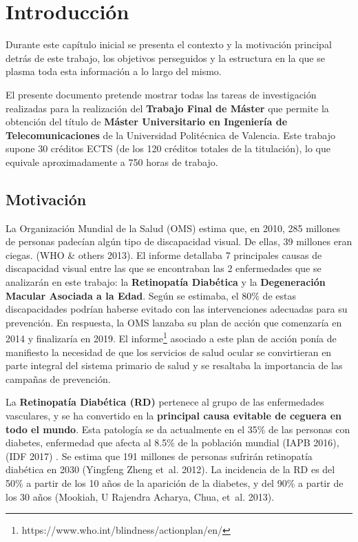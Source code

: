 \documentclass[
  12pt,
  spanish,
  a4paperpaper,
]{report}
\begin{document}
\newpage
\setcounter{page}{1}
\renewcommand{\thepage}{\arabic{page}}

\hypertarget{intro}{%
\chapter{Introducción}\label{intro}}

Durante este capítulo inicial se presenta el contexto y la motivación
principal detrás de este trabajo, los objetivos perseguidos y la
estructura en la que se plasma toda esta información a lo largo del
mismo.

El presente documento pretende mostrar todas las tareas de investigación
realizadas para la realización del \textbf{Trabajo Final de Máster} que
permite la obtención del título de \textbf{Máster Universitario en
Ingeniería de Telecomunicaciones} de la Universidad Politécnica de
Valencia. Este trabajo supone 30 créditos ECTS (de los 120 créditos
totales de la titulación), lo que equivale aproximadamente a 750 horas
de trabajo.

\hypertarget{motivaciuxf3n}{%
\section{Motivación}\label{motivaciuxf3n}}

La Organización Mundial de la Salud (OMS) estima que, en 2010, 285
millones de personas padecían algún tipo de discapacidad visual. De
ellas, 39 millones eran ciegas. (WHO \& others 2013). El informe
detallaba 7 principales causas de discapacidad visual entre las que se
encontraban las 2 enfermedades que se analizarán en este trabajo: la
\textbf{Retinopatía Diabética} y la \textbf{Degeneración Macular
Asociada a la Edad}. Según se estimaba, el 80\% de estas discapacidades
podrían haberse evitado con las intervenciones adecuadas para su
prevención. En respuesta, la OMS lanzaba su plan de acción que
comenzaría en 2014 y finalizaría en 2019. El informe\footnote{https://www.who.int/blindness/actionplan/en/}
asociado a este plan de acción ponía de manifiesto la necesidad de que
los servicios de salud ocular se convirtieran en parte integral del
sistema primario de salud y se resaltaba la importancia de las campañas
de prevención.

La \textbf{Retinopatía Diabética (RD)} pertenece al grupo de las
enfermedades vasculares, y se ha convertido en la \textbf{principal
causa evitable de ceguera en todo el mundo}. Esta patología se da
actualmente en el 35\% de las personas con diabetes, enfermedad que
afecta al 8.5\% de la población mundial (IAPB 2016), (IDF 2017) . Se
estima que 191 millones de personas sufrirán retinopatía diabética en
2030 (Yingfeng Zheng et~al. 2012). La incidencia de la RD es del 50\% a
partir de los 10 años de la aparición de la diabetes, y del 90\% a
partir de los 30 años (Mookiah, U Rajendra Acharya, Chua, et~al. 2013).
\end{document}
